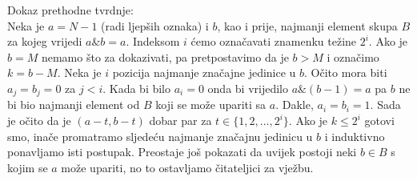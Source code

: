 \documentclass[a4paper]{article}
\begin{document}
Dokaz prethodne tvrdnje:\\
Neka je $a = N - 1$ (radi ljepših oznaka) i $b$, kao i prije, najmanji element
skupa $B$ za kojeg vrijedi $a \mathbin\& b = a$. Indeksom $i$ ćemo označavati znamenku
težine $2^i$. Ako je $b = M$ nemamo što za dokazivati, pa pretpostavimo da je
$b > M$ i označimo $k = b - M$. Neka je $i$ pozicija najmanje značajne jedinice u $b$.
Očito mora biti $a_j = b_j = 0$ za $j < i$. Kada bi bilo $a_i = 0$ onda bi vrijedilo
$a \mathbin\& (b - 1) = a$ pa $b$ ne bi bio najmanji element od $B$ koji se može upariti
sa $a$. Dakle, $a_i = b_i = 1$. Sada je očito da je $(a - t, b - t)$ dobar par za
$t \in \{1, 2, ..., 2^i\}$. Ako je $k \leq 2^i$ gotovi smo, inače promatramo sljedeću
najmanje značajnu jedinicu u $b$ i induktivno ponavljamo isti postupak.
Preostaje još pokazati da uvijek postoji neki $b \in B$ s kojim se $a$ može upariti, no
to ostavljamo čitateljici za vježbu.
\end{document}

